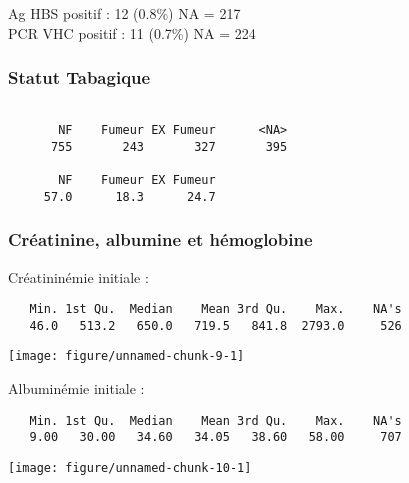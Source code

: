 \documentclass[11pt,a4paper]{article}\usepackage[]{graphicx}\usepackage[]{color}
\makeatletter
\def\maxwidth{ %
  \ifdim\Gin@nat@width>\linewidth
    \linewidth
  \else
    \Gin@nat@width
  \fi
}
\newenvironment{kframe}{%
 \def\at@end@of@kframe{}%
 \ifinner\ifhmode%
  \def\at@end@of@kframe{\end{minipage}}%
  \begin{minipage}{\columnwidth}%
 \fi\fi%
 \def\FrameCommand##1{\hskip\@totalleftmargin \hskip-\fboxsep
 \colorbox{shadecolor}{##1}\hskip-\fboxsep
     \hskip-\linewidth \hskip-\@totalleftmargin \hskip\columnwidth}%
 \MakeFramed {\advance\hsize-\width
   \@totalleftmargin\z@ \linewidth\hsize
   \@setminipage}}%
 {\par\unskip\endMakeFramed%
 \at@end@of@kframe}
\newenvironment{knitrout}{}{} %
\makeatother
\begin{document}
Ag HBS positif : 12 (0.8\%) NA = 217
~\\

PCR VHC positif : 11 (0.7\%) NA = 224


    \subsubsection{Statut Tabagique}

\begin{knitrout}
\color{fgcolor}\begin{kframe}
\begin{verbatim}

       NF    Fumeur EX Fumeur      <NA> 
      755       243       327       395 

       NF    Fumeur EX Fumeur 
     57.0      18.3      24.7 
\end{verbatim}
\end{kframe}
\end{knitrout}

    \subsubsection{Créatinine, albumine et hémoglobine}

Créatininémie initiale :

\begin{knitrout}
\color{fgcolor}\begin{kframe}
\begin{verbatim}
   Min. 1st Qu.  Median    Mean 3rd Qu.    Max.    NA's 
   46.0   513.2   650.0   719.5   841.8  2793.0     526 
\end{verbatim}
\end{kframe}
\texttt{[image: figure/unnamed-chunk-9-1]} 

\end{knitrout}

Albuminémie initiale :

\begin{knitrout}
\color{fgcolor}\begin{kframe}
\begin{verbatim}
   Min. 1st Qu.  Median    Mean 3rd Qu.    Max.    NA's 
   9.00   30.00   34.60   34.05   38.60   58.00     707 
\end{verbatim}
\end{kframe}
\texttt{[image: figure/unnamed-chunk-10-1]} 

\end{knitrout}
\end{document}
